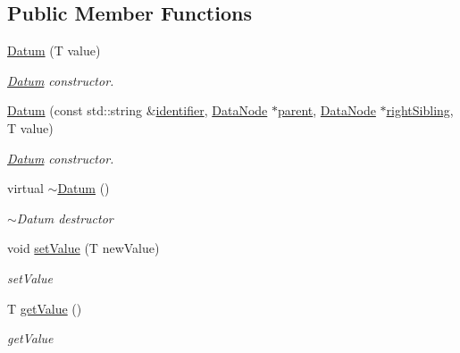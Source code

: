 \subsection*{Public Member Functions}
\begin{DoxyCompactItemize}
\item 
\hyperlink{classDatabase_1_1Datum_a6c8c58a7e440ababc4f0a87f5da4d387}{Datum} (T value)
\begin{DoxyCompactList}\small\item\em \hyperlink{classDatabase_1_1Datum}{Datum} constructor. \end{DoxyCompactList}\item 
\hyperlink{classDatabase_1_1Datum_af00751a057fe19a929a979d7a925ef0a}{Datum} (const std\+::string \&\hyperlink{classDatabase_1_1DataNode_ace59a7fba9c490d2dae59c4af7b0c71f}{identifier}, \hyperlink{classDatabase_1_1DataNode}{Data\+Node} $\ast$\hyperlink{classDatabase_1_1DataNode_a8d70472d0f14aa3ae3ee74d9f3e879d6}{parent}, \hyperlink{classDatabase_1_1DataNode}{Data\+Node} $\ast$\hyperlink{classDatabase_1_1DataNode_ae335fc33c3813e8a6638d50faef44d5d}{right\+Sibling}, T value)
\begin{DoxyCompactList}\small\item\em \hyperlink{classDatabase_1_1Datum}{Datum} constructor. \end{DoxyCompactList}\item 
virtual \hyperlink{classDatabase_1_1Datum_a973e321d98f8be376fd8ec772446f480}{$\sim$\+Datum} ()\hypertarget{classDatabase_1_1Datum_a973e321d98f8be376fd8ec772446f480}{}\label{classDatabase_1_1Datum_a973e321d98f8be376fd8ec772446f480}

\begin{DoxyCompactList}\small\item\em $\sim$\+Datum destructor \end{DoxyCompactList}\item 
void \hyperlink{classDatabase_1_1Datum_a636a8ed59bfcb2947100f8181a9b5c73}{set\+Value} (T new\+Value)
\begin{DoxyCompactList}\small\item\em set\+Value \end{DoxyCompactList}\item 
T \hyperlink{classDatabase_1_1Datum_a1965d14f29d7bc7369ce1d96f529124f}{get\+Value} ()
\begin{DoxyCompactList}\small\item\em get\+Value \end{DoxyCompactList}\end{DoxyCompactItemize}
